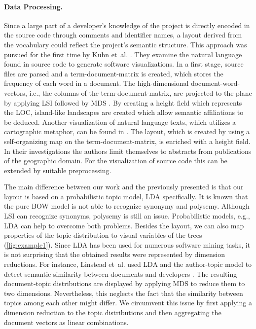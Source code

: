 \documentclass[a4paper,twoside]{article}
\begin{document}
\paragraph{Data Processing.}
Since a large part of a developer's knowledge of the project is directly encoded in the source code through comments and identifier names, a layout derived from the vocabulary could reflect the project's semantic structure.
This approach was pursued for the first time by Kuhn et~al. \cite{kuhn2008consistentlayout}.
They examine the natural language found in source code to generate software visualizations.
In a first stage, source files are parsed and a term-document-matrix is created, which stores the frequency of each word in a document.
The high-dimensional document-word-vectors, i.e., the columns of the term-document-matrix, are projected to the plane by applying \ac{LSI} \cite{deerwester1990indexing} followed by \ac{MDS} \cite{cox2008multidimensional}.
By creating a height field which represents the LOC, island-like landscapes are created which allow semantic affiliations to be deduced.
Another visualization of natural language texts, which utilizes a cartographic metaphor, can be found in \cite{skupin2004worldofgeography}.
The layout, which is created by using a self-organizing map \cite{kohonen1997som} on the term-document-matrix, is enriched with a height field.
In their investigations the authors limit themselves to abstracts from publications of the geographic domain.
For the visualization of source code this can be extended by suitable preprocessing.

The main difference between our work and the previously presented is that our layout is based on a probabilistic topic model, \ac{LDA} specifically.
It is known that the pure \ac{BOW} model is not able to recognize synonymy and polysemy.
Although \ac{LSI} can recognize synonyms, polysemy is still an issue.
Probabilistic models, e.g., \ac{LDA} can help to overcome both problems.
Besides the layout, we can also map properties of the topic distribution to visual variables of the trees (\autoref{fig:example1}).
Since \ac{LDA} has been used for numerous software mining tasks, it is not surprising that the obtained results were represented by dimension reductions.
For instance, Linstead et~al. used LDA and the author-topic model \cite{rosen-zvi2004authors} to detect semantic similarity between documents and developers \cite{linstead09sourcerer}.
The resulting document-topic distributions are displayed by applying \ac{MDS} to reduce them to two dimensions.
Nevertheless, this neglects the fact that the similarity between topics among each other might differ.
We circumvent this issue by first applying a dimension reduction to the topic distributions and then aggregating the document vectors as linear combinations.
\end{document}
